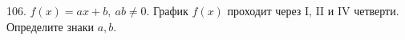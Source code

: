 106. $f(x)=ax+b,\ ab\neq 0.$ График $f(x)$ проходит через I, II и IV четверти. Определите знаки $a,b.$\\
